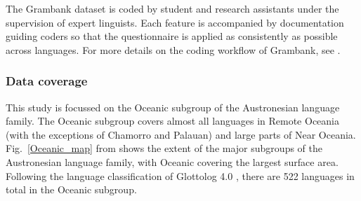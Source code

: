 \documentclass[a4paper,10pt]{article} %
\begin{document}
The Grambank dataset is coded by student and research assistants under the supervision of expert linguists. Each feature is accompanied by documentation guiding coders so that the questionnaire is applied as consistently as possible across languages. For more details on the coding workflow of Grambank, see \citet{slingerland2020coding}. %



\subsubsection{Data coverage} 
This study is focussed on the Oceanic subgroup of the Austronesian language family. The Oceanic subgroup covers almost all languages in Remote Oceania (with the exceptions of Chamorro and Palauan) and large parts of Near Oceania. Fig.~\ref{Oceanic_map} from \citet[2]{protooceanicvol5} shows the extent of the major subgroups of the Austronesian language family, with Oceanic covering the largest surface area. Following the language classification of Glottolog 4.0 \citep{glottolog40}, there are 522 languages in total in the Oceanic subgroup.
\end{document}
